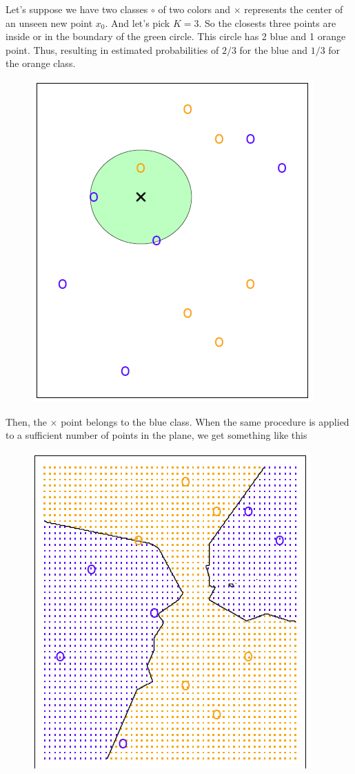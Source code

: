 \documentclass[11pt]{article}
\makeatletter
\def\maxwidth{\ifdim\Gin@nat@width>\linewidth\linewidth
    \else\Gin@nat@width\fi}
\let\Oldincludegraphics\includegraphics
\renewcommand{\includegraphics}[1]{\Oldincludegraphics[width=.8\maxwidth]{#1}}
\makeatother
\begin{document}
Let's suppose we have two classes \(\circ\) of two colors and \(\times\)
represents the center of an unseen new point \(x_0\). And let's pick
\(K=3\). So the closests three points are inside or in the boundary of
the green circle. This circle has 2 blue and 1 orange point. Thus,
resulting in estimated probabilities of \(2/3\) for the blue and \(1/3\)
for the orange class.


\begin{figure}[h!]
    \centering
    \includegraphics{knn_2d.png}
 \end{figure}

Then, the \(\times\) point belongs to the blue class. When the same
procedure is applied to a sufficient number of points in the plane, we
get something like this

\begin{figure}[h!]
    \centering
    \includegraphics{knn_2dbis.png}
\end{figure}
\end{document}
